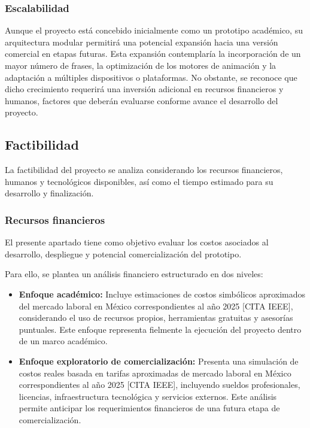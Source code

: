 \subsubsection{Escalabilidad}
Aunque el proyecto está concebido inicialmente como un prototipo académico, su arquitectura modular permitirá una potencial expansión hacia una versión comercial en etapas futuras. Esta expansión contemplaría la incorporación de un mayor número de frases, la optimización de los motores de animación y la adaptación a múltiples dispositivos o plataformas. No obstante, se reconoce que dicho crecimiento requerirá una inversión adicional en recursos financieros y humanos, factores que deberán evaluarse conforme avance el desarrollo del proyecto.

\subsection{Factibilidad}
La factibilidad del proyecto se analiza considerando los recursos financieros, humanos y tecnológicos disponibles, así como el tiempo estimado para su desarrollo y finalización.

\subsubsection{Recursos financieros}
El presente apartado tiene como objetivo evaluar los costos asociados al desarrollo, despliegue y potencial comercialización del prototipo. 

Para ello, se plantea un análisis financiero estructurado en dos niveles: 

\begin{itemize}
	\item \textbf{Enfoque académico:} Incluye estimaciones de costos simbólicos aproximados del mercado laboral en México correspondientes al año 2025 [CITA IEEE], considerando el uso de recursos propios, herramientas gratuitas y asesorías puntuales. Este enfoque representa fielmente la ejecución del proyecto dentro de un marco académico.
	
	\item \textbf{Enfoque exploratorio de comercialización:} Presenta una simulación de costos reales basada en tarifas aproximadas de mercado laboral en México correspondientes al año 2025 [CITA IEEE], incluyendo sueldos profesionales, licencias, infraestructura tecnológica y servicios externos. Este análisis permite anticipar los requerimientos financieros de una futura etapa de comercialización.
\end{itemize}

